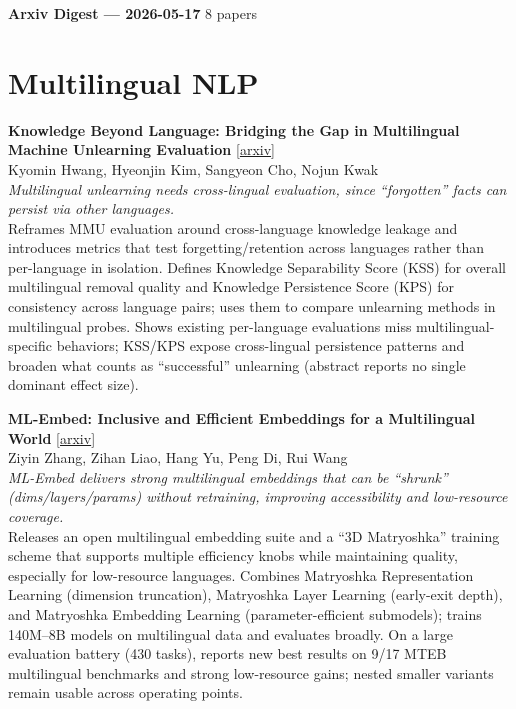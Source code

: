 \documentclass[12pt,letterpaper]{article}
\begin{document}
{\footnotesize\textbf{Arxiv Digest --- 2026-05-17} \hfill 8 papers}

\smallskip

\section*{Multilingual NLP}

{\small\textbf{Knowledge Beyond Language: Bridging the Gap in Multilingual Machine Unlearning Evaluation}} {\scriptsize[\href{https://arxiv.org/abs/2605.14404}{arxiv}]}\\
{\scriptsize Kyomin Hwang, Hyeonjin Kim, Sangyeon Cho, Nojun Kwak}\\

{\small\textit{Multilingual unlearning needs cross-lingual evaluation, since ``forgotten'' facts can persist via other languages.}}\\[1pt]
{\footnotesize Reframes MMU evaluation around cross-language knowledge leakage and introduces metrics that test forgetting/retention across languages rather than per-language in isolation. Defines Knowledge Separability Score (KSS) for overall multilingual removal quality and Knowledge Persistence Score (KPS) for consistency across language pairs; uses them to compare unlearning methods in multilingual probes. Shows existing per-language evaluations miss multilingual-specific behaviors; KSS/KPS expose cross-lingual persistence patterns and broaden what counts as ``successful'' unlearning (abstract reports no single dominant effect size).}

\medskip

{\small\textbf{ML-Embed: Inclusive and Efficient Embeddings for a Multilingual World}} {\scriptsize[\href{https://arxiv.org/abs/2605.15081}{arxiv}]}\\
{\scriptsize Ziyin Zhang, Zihan Liao, Hang Yu, Peng Di, Rui Wang}\\

{\small\textit{ML-Embed delivers strong multilingual embeddings that can be ``shrunk'' (dims/layers/params) without retraining, improving accessibility and low-resource coverage.}}\\[1pt]
{\footnotesize Releases an open multilingual embedding suite and a ``3D Matryoshka'' training scheme that supports multiple efficiency knobs while maintaining quality, especially for low-resource languages. Combines Matryoshka Representation Learning (dimension truncation), Matryoshka Layer Learning (early-exit depth), and Matryoshka Embedding Learning (parameter-efficient submodels); trains 140M--8B models on multilingual data and evaluates broadly. On a large evaluation battery (430 tasks), reports new best results on 9/17 MTEB multilingual benchmarks and strong low-resource gains; nested smaller variants remain usable across operating points.}
\end{document}
